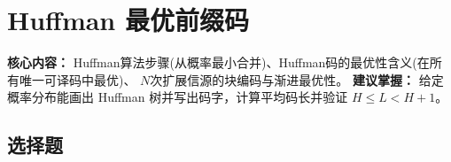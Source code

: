 \documentclass[12pt,a4paper]{ctexart}
\begin{document}
\newpage

\section{Huffman 最优前缀码}

\begin{notetested}
\textbf{核心内容：} Huffman算法步骤(从概率最小合并)、Huffman码的最优性含义(在所有唯一可译码中最优)、
$N$次扩展信源的块编码与渐进最优性。
\textbf{建议掌握：} 给定概率分布能画出 Huffman 树并写出码字，计算平均码长并验证 $H \leq L < H+1$。
\end{notetested}

\subsection*{选择题}
\end{document}
